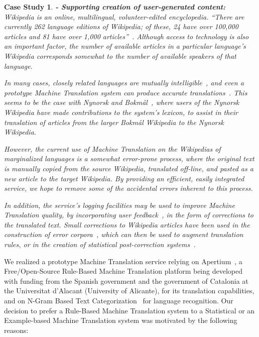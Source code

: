 \documentclass[11pt]{article}
\newtheorem{cs}{Case Study}
\begin{document}
\begin{cs}{\bf - Supporting creation of user-generated content:}
Wikipedia is an online, multilingual, volunteer-edited encyclopedia. ``There are currently 262 language editions of Wikipedia; of these, 24 have over 100,000 articles and 81 have over 1,000 articles''~\citep{wikipedia}. Although access to technology is also an important factor, the number of available articles in a particular language's Wikipedia corresponds somewhat to the number of available speakers of that language.

In many cases, closely related languages are mutually intelligible~\citep{tyers09a}, and even a prototype Machine Translation system can produce accurate translations~\citep{oller06}. This seems to be the case with Nynorsk and Bokmål~\citep{unhammer09}, where users of the Nynorsk Wikipedia have made contributions to the system's lexicon, to assist in their translation of articles from the larger Bokmål Wikipedia to the Nynorsk Wikipedia.

However, the current use of Machine Translation on the Wikipedias of marginalized languages is a somewhat error-prone process, where the original text is manually copied from the source Wikipedia, translated off-line, and pasted as a new article to the target Wikipedia. By providing an efficient, easily integrated service, we hope to remove some of the accidental errors inherent to this process.

In addition, the service's logging facilities may be used to improve Machine Translation quality, by incorporating user feedback~\citep{google}, in the form of corrections to the translated text. Small corrections to Wikipedia articles have been used in the construction of error corpora~\citep{milek08}, which can then be used to augment translation rules, or in the creation of statistical post-correction systems~\citep{dugast07}.
\end{cs}

We realized a prototype Machine Translation service relying on Apertium~\citep{armentano05p}, a Free/Open-Source Rule-Based Machine Translation platform being developed with funding from the Spanish government and the government of Catalonia at the Universitat d'Alacant (University of Alicante), for its translation capabilities, and on N-Gram Based Text Categorization~\citep{textcat} for language recognition. Our decision to prefer a Rule-Based Machine Translation system to a Statistical or an Example-based Machine Translation system was motivated by the following reasons:
\end{document}
